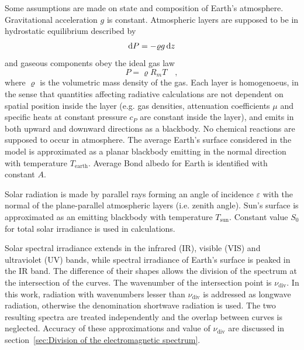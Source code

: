 \documentclass[a4paper,10pt,twocolumn,\classoptions]{article}
\begin{document}
Some assumptions are made on state and composition of Earth's atmosphere. Gravitational acceleration $g$ is constant. Atmospheric layers are supposed to be in hydrostatic equilibrium described by
\begin{equation}
  \label{eq:hydrostatic_equilibrium}
  \odif{P} = - \varrho g \odif{z}
\end{equation}
and gaseous components obey the ideal gas law
\begin{equation}
  \label{eq:ideal_gas_law}
  P = \varrho R_m T
  \quad ,
\end{equation}
where $\varrho$ is the volumetric mass density of the gas.
Each layer is homogenoeus, in the sense that quantities affecting radiative calculations are not dependent on spatial position inside the layer (e.g. gas densities, attenuation coefficients $\mu$ and specific heats at constant pressure $c_P$ are constant inside the layer), and emits in both upward and downward directions as a blackbody. No chemical reactions are supposed to occur in atmosphere.
The average Earth's surface considered in the model is approximated as a planar blackbody emitting in the normal direction with temperature $T_\text{earth}$. Average Bond albedo for Earth is identified with constant $A$.

Solar radiation is made by parallel rays forming an angle of incidence $\varepsilon$ with the normal of the plane-parallel atmospheric layers (i.e. zenith angle). %
Sun's surface is approximated as an emitting blackbody with temperature $T_\text{sun}$. Constant value $S_0$ for total solar irradiance is used in calculations.

Solar spectral irradiance extends in the infrared (IR), visible (VIS) and ultraviolet (UV) bands, while spectral irradiance of Earth's surface is peaked in the IR band. The difference of their shapes allows the division of the spectrum at the intersection of the curves. The wavenumber of the intersection point is $\nu_\text{div}$. In this work, radiation with wavenumbers lesser than $\nu_\text{div}$ is addressed as longwave radiation, otherwise the denomination shortwave radiation is used. The two resulting spectra are treated independently and the overlap between curves is neglected. Accuracy of these approximations and value of $\nu_\text{div}$ are discussed in section~\ref{sec:Division of the electromagnetic spectrum}.
\end{document}

